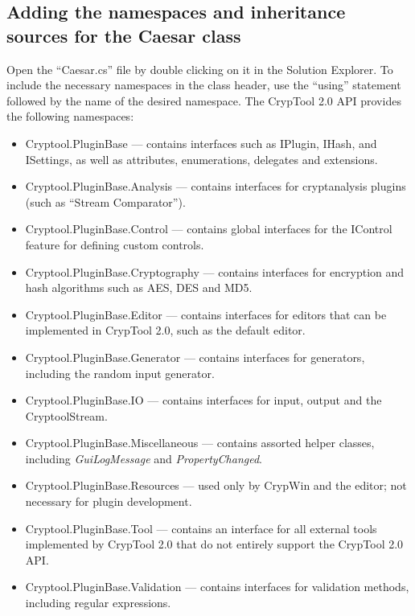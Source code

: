 \subsection{Adding the namespaces and inheritance sources for the Caesar class}
\label{sec:AddingTheNamespacesAndInheritanceSourcesForTheCaesarClass}

Open the ``Caesar.cs'' file by double clicking on it in the Solution Explorer. To include the necessary namespaces in the class header, use the ``using'' statement followed by the name of the desired namespace. The CrypTool 2.0 API provides the following namespaces:

\begin{itemize}
	\item Cryptool.PluginBase --- contains interfaces such as IPlugin, IHash, and ISettings, as well as attributes, enumerations, delegates and extensions.
	\item Cryptool.PluginBase.Analysis --- contains interfaces for cryptanalysis plugins (such as ``Stream Comparator'').
	\item Cryptool.PluginBase.Control --- contains global interfaces for the IControl feature for defining custom controls.
	\item Cryptool.PluginBase.Cryptography --- contains interfaces for encryption and hash algorithms such as AES, DES and MD5.
	\item Cryptool.PluginBase.Editor --- contains interfaces for editors that can be implemented in CrypTool 2.0, such as the default editor.
	\item Cryptool.PluginBase.Generator --- contains interfaces for generators, including the random input generator.
	\item Cryptool.PluginBase.IO --- contains interfaces for input, output and the CryptoolStream.
	\item Cryptool.PluginBase.Miscellaneous --- contains assorted helper classes, including \textit{GuiLogMessage} and \textit{PropertyChanged}.
	\item Cryptool.PluginBase.Resources --- used only by CrypWin and the editor; not necessary for plugin development.
	\item Cryptool.PluginBase.Tool --- contains an interface for all external tools implemented by CrypTool 2.0 that do not entirely support the CrypTool 2.0 API.
	\item Cryptool.PluginBase.Validation --- contains interfaces for validation methods, including regular expressions.
\end{itemize}


